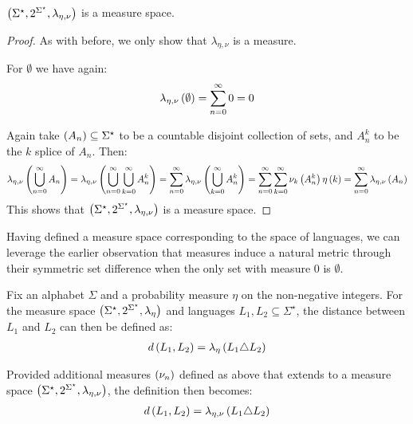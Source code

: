 \begin{theorem}
  \(\left(\Sigma^\star, 2^{\Sigma^\star}, \lambda_{\eta, \nu}\right)\)
  is a measure space.
\end{theorem}
\begin{proof}
  As with before, we only show that \(\lambda_{\eta, \nu}\) is a measure.

  For \(\emptyset\) we have again:
  \begin{align*}
    \lambda_{\eta, \nu}\left(\emptyset\right) = \sum_{n = 0}^{\infty} 0 = 0
  \end{align*}

  Again take \(\left(A_n\right) \subseteq \Sigma^\star\) to be a
  countable disjoint collection of sets,
  and \(A_n ^k\) to be the \(k\) splice of \(A_n\).
  Then:
  \begin{align*}
    \lambda_{\eta, \nu} \left(\bigcup_{n = 0}^{\infty} A_n\right)
      = \lambda_{\eta, \nu} \left(\bigcup_{n = 0}^{\infty} \bigcup_{k = 0}^{\infty} A_n ^k\right)
      = \sum_{n = 0}^{\infty} \lambda_{\eta, \nu} \left(\bigcup_{k = 0}^{\infty} A_n ^k\right)
      = \sum_{n = 0}^{\infty} \sum_{k = 0}^{\infty} \nu_k \left(A_n ^k\right) \eta\left(k\right)
      = \sum_{n = 0}^{\infty} \lambda_{\eta, \nu} \left(A_n\right)
  \end{align*}
  This shows that
  \(\left(\Sigma^\star, 2^{\Sigma^\star}, \lambda_{\eta, \nu}\right)\)
  is a measure space.
\end{proof}

Having defined a measure space corresponding to the space of languages,
we can leverage the earlier observation that measures induce a natural
metric through their symmetric set difference
when the only set with measure \(0\) is \(\emptyset\).

\begin{example}
  Fix an alphabet \(\Sigma\) and a probability measure \(\eta\) on
  the non-negative integers.
  For the measure space
  \(\left(\Sigma^\star, 2^{\Sigma^\star}, \lambda_{\eta}\right)\) and
  languages \(L_1, L_2 \subseteq \Sigma^\star\),
  the distance between \(L_1\) and \(L_2\) can then be defined as:
  \begin{align*}
    d\left(L_1, L_2\right) = \lambda_{\eta} \left(L_1 \triangle L_2\right)
  \end{align*}

  Provided additional measures \(\left(\nu_n\right)\) defined as above
  that extends to a measure space
  \(\left(\Sigma^\star, 2^{\Sigma^\star}, \lambda_{\eta, \nu}\right)\),
  the definition then becomes:
  \begin{align*}
    d \left(L_1, L_2\right) = \lambda_{\eta, \nu} \left(L_1 \triangle L_2\right)
  \end{align*}

\end{example}


